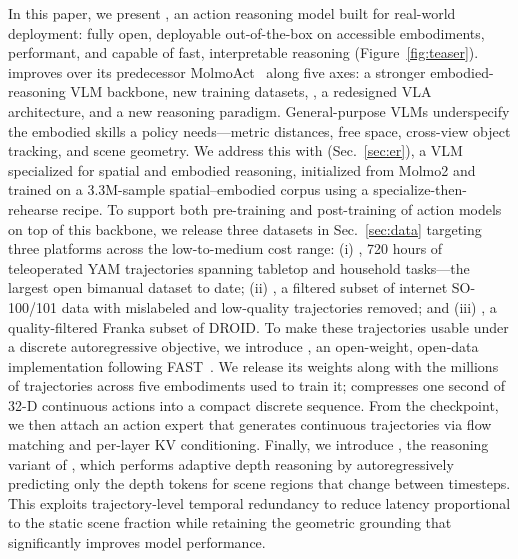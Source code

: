 In this paper, we present \molmoactt, an action reasoning model built for real-world deployment: fully open, deployable out-of-the-box on accessible embodiments, performant, and capable of fast, interpretable reasoning (Figure~\ref{fig:teaser}). \molmoactt improves over its predecessor MolmoAct~\citep{lee2025molmoactactionreasoningmodels} along five axes: a stronger embodied-reasoning VLM backbone, new training datasets, \molmoactfast, a redesigned VLA architecture, and a new reasoning paradigm.
General-purpose VLMs underspecify the embodied skills a policy needs—metric distances, free space, cross-view object tracking, and scene geometry. We address this with \molmoer (Sec.~\ref{sec:er}), a VLM specialized for spatial and embodied reasoning, initialized from Molmo2 and trained on a 3.3M-sample spatial–embodied corpus using a specialize-then-rehearse recipe. To support both pre-training and post-training of action models on top of this backbone, we release three datasets in Sec.~\ref{sec:data} targeting three platforms across the low-to-medium cost range: (i) \molmoacttyamdata, 720 hours of teleoperated YAM trajectories spanning tabletop and household tasks—the largest open bimanual dataset to date; (ii) \molmoacttsodata, a filtered subset of internet SO-100/101 data with mislabeled and low-quality trajectories removed; and (iii) \molmoacttdroiddata, a quality-filtered Franka subset of DROID. To make these trajectories usable under a discrete autoregressive objective, we introduce \molmoactfast, an open-weight, open-data implementation following FAST~\citep{pertsch2025fast}. We release its weights along with the millions of trajectories across five embodiments used to train it; \molmoactfast compresses one second of 32-D continuous actions into a compact discrete sequence. From the \molmoacttpre checkpoint, we then attach an action expert that generates continuous trajectories via flow matching and per-layer KV conditioning. Finally, we introduce \molmothink, the reasoning variant of \molmoactt, which performs adaptive depth reasoning by autoregressively predicting only the depth tokens for scene regions that change between timesteps. This exploits trajectory-level temporal redundancy to reduce latency proportional to the static scene fraction while retaining the geometric grounding that significantly improves model performance.

